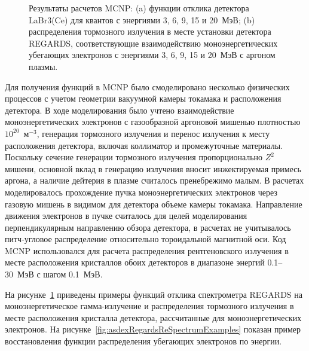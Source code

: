 \begin{figure}[ht!]
  \caption{ Результаты расчетов MCNP: (a) функции отклика детектора LaBr3(Ce) для квантов с энергиями 3, 6, 9, 15 и 20~МэВ; (b) распределения тормозного излучения в месте установки детектора REGARDS, соответствующие взаимодействию моноэнергетических убегающих электронов с энергиями 3, 6, 9, 15 и 20~МэВ с аргоном плазмы.~\cite{Shevelev2021} }
  \label{fig:asdexRegardsResponses}
\end{figure}

Для получения функций в MCNP было смоделировано несколько физических процессов с учетом геометрии вакуумной камеры токамака и расположения детектора. В ходе моделирования было учтено взаимодействие моноэнергетических электронов с газообразной аргоновой мишенью плотностью $10^{20}$~м${}^{-3}$, генерация тормозного излучения и перенос излучения к месту расположения детектора, включая коллиматор и промежуточные материалы. Поскольку сечение генерации тормозного излучения пропорционально $Z^2$ мишени, основной вклад в генерацию излучения вносит инжектируемая примесь аргона, а наличие дейтерия в плазме считалось пренебрежимо малым. В расчетах моделировалось прохождение пучка моноэнергетических электронов через газовую мишень в видимом для детектора объеме камеры токамака. Направление движения электронов в пучке считалось для целей моделирования перпендикулярным направлению обзора детектора, в расчетах не учитывалось питч-угловое распределение относительно тороидальной магнитной оси. Код MCNP использовался для расчета распределения рентгеновского излучения в месте расположения кристаллов обоих детекторов в диапазоне энергий 0.1--30~МэВ с шагом 0.1~МэВ. 

На рисунке~\ref{fig:asdexRegardsResponses} приведены примеры функций отклика спектрометра REGARDS на моноэнергетическое гамма-излучение и распределения тормозного излучения в месте расположения кристалла детектора, рассчитанные для моноэнергетических электронов. На рисунке~\ref{fig:asdexRegardsReSpectrumExamples} показан пример восстановления функции распределения убегающих электронов по энергии.

